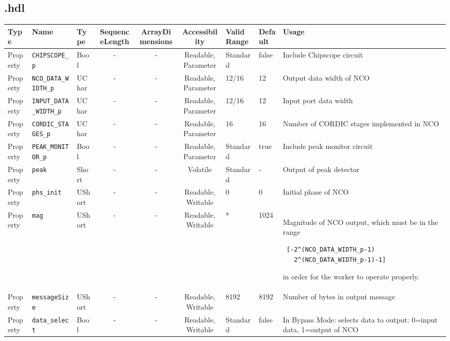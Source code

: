 \begin{landscape}
	\subsection*{\comp.hdl}
	\begin{scriptsize}
		\begin{tabular}{|p{1.5cm}|p{2.5cm}|p{1cm}|c|c|c|p{2cm}|p{1cm}|p{5cm}|}
			\hline
			\rowcolor{blue}
			Type     & Name                      & Type  & SequenceLength & ArrayDimensions & Accessibility       & Valid Range & Default & Usage                                      \\
			\hline
			Property & \verb+CHIPSCOPE_p+        & Bool  & -              & -               & Readable, Parameter & Standard    & false   & Include Chipscope circuit                  \\
			\hline
			Property & \verb+NCO_DATA_WIDTH_p+   & UChar & -              & -               & Readable, Parameter & 12/16       & 12      & Output data width of NCO                   \\
			\hline
			Property & \verb+INPUT_DATA_WIDTH_p+ & UChar & -              & -               & Readable, Parameter & 12/16       & 12      & Input port data width                      \\
			\hline
			Property & \verb+CORDIC_STAGES_p+    & UChar & -              & -               & Readable, Parameter & 16          & 16      & Number of CORDIC stages implemented in NCO \\
			\hline
			Property & \verb+PEAK_MONITOR_p+     & Bool  & -              & -               & Readable, Parameter & Standard    & true    & Include peak monitor circuit               \\
			\hline
			Property & \verb+peak+               & Short & -              & -               & Volatile            & Standard    & -       & Output of peak detector                    \\
			\hline
			Property & \verb+phs_init+    & UShort & -              & -               & Readable, Writable & 0           & 0       & Initial phase of NCO                                                          \\
			\hline
			Property & \verb+mag+         & UShort & -              & -               & Readable, Writable & *           & 1024    & Magnitude of NCO output, which must be in the range \scriptsize\begin{verbatim} [-2^(NCO_DATA_WIDTH_p-1)
   2^(NCO_DATA_WIDTH_p-1)-1]\end{verbatim} in order for the worker to operate properly. \\
			\hline
			Property & \verb+messageSize+ & UShort & -              & -               & Readable, Writable & 8192        & 8192    & Number of bytes in output message                                             \\
			\hline
			Property & \verb+data_select+     & Bool  & -              & -               & Readable, Writable & Standard    & false    & In Bypass Mode: selects data to output: 0=input data, 1=output of NCO   \\
			\hline
		\end{tabular}
	\end{scriptsize}


\end{landscape}
